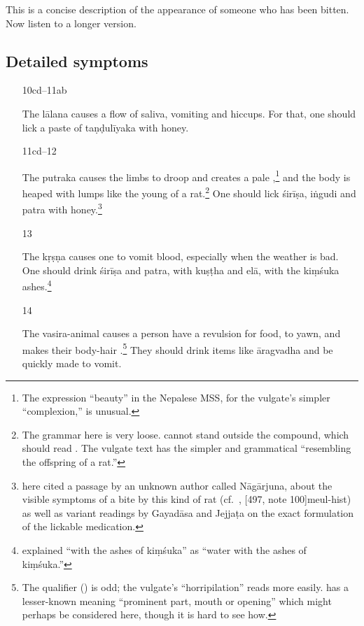 \begin{translation}
This is a concise description of the appearance of someone who has been 
bitten.  Now listen to a longer version. 

\subsection{Detailed symptoms}

\begin{itemize}
\item[10cd--11ab]

The \Gls{lālana} causes a flow of saliva, vomiting and hiccups.  For that, one 
should lick a paste of \gls{taṇḍulīyaka} with honey. 

\item [11cd--12]

The \Gls{putraka} causes the limbs to droop and creates a pale
,\footnote{The expression  “beauty” in the
    Nepalese MSS, for the vulgate's simpler  “complexion,” is
    unusual.} and the body is heaped with lumps like the young of a
    rat.\footnote{The grammar here is very loose.  cannot
        stand outside the compound, which should read
        .  The vulgate text has the simpler and
        grammatical  “resembling the offspring of a
        rat.”}  One should lick \gls{śirīṣa}, \gls{iṅgudi} and \gls{patra}
        with honey.\footnote{ here cited a passage 
        by
            an unknown author called Nāgārjuna, about the visible symptoms of a
            bite by this kind of rat (cf.\ \cite[45--46]{shar-1982},
            [497, note 100]{meul-hist}) as well as variant readings
            by Gayadāsa and Jejjaṭa on the exact formulation of the lickable
            medication.}

\item [13]

The \Gls{kṛṣṇa} causes one to vomit blood, especially when the
weather is bad.  One should drink \gls{śirīṣa} and \gls{patra},  
with \gls{kuṣṭha} and \gls{elā}, with the 
\gls{kiṃśuka} ashes.\footnote{ explained “with the 
ashes of \gls{kiṃśuka}” as “water with the ashes of \gls{kiṃśuka}.”}

\item [14]

The \Gls{vasira-animal} causes a person have a revulsion for food, to yawn,
and makes their body-hair .\footnote{The qualifier
     () is odd; the vulgate's 
    “horripilation” reads more easily.  has a lesser-known
    meaning “prominent part, mouth or opening” which might perhaps be
    considered here, though it is hard to see how.}  They should drink
    items like \gls{āragvadha} and be quickly made to vomit.


\end{itemize}
\end{translation}
